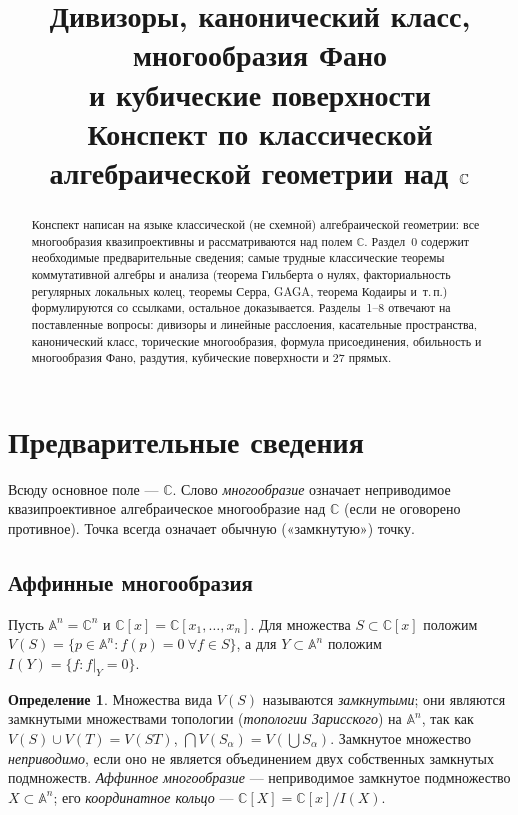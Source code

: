 \documentclass[11pt,a4paper]{article}
\title{Дивизоры, канонический класс, многообразия Фано\\ и кубические поверхности\\[4pt]
\large Конспект по классической алгебраической геометрии над $\C$}
\author{}
\date{}
\theoremstyle{plain}
\theoremstyle{definition}
\newtheorem{definition}[theorem]{Определение}
\theoremstyle{remark}
\renewcommand{\C}{\mathbb{C}}
\newcommand{\A}{\mathbb{A}}
\begin{document}
\maketitle

\begin{abstract}
Конспект написан на языке классической (не схемной) алгебраической геометрии: все многообразия
квазипроективны и рассматриваются над полем $\C$. Раздел~0 содержит необходимые предварительные
сведения; самые трудные классические теоремы коммутативной алгебры и анализа (теорема Гильберта
о нулях, факториальность регулярных локальных колец, теоремы Серра, GAGA, теорема Кодаиры и~т.\,п.)
формулируются со ссылками, остальное доказывается. Разделы~1--8 отвечают на поставленные вопросы:
дивизоры и линейные расслоения, касательные пространства, канонический класс, торические
многообразия, формула присоединения, обильность и многообразия Фано, раздутия, кубические
поверхности и 27 прямых.
\end{abstract}

\tableofcontents

\setcounter{section}{-1}
\section{Предварительные сведения}\label{sec:0}

Всюду основное поле --- $\C$. Слово \emph{многообразие} означает неприводимое квазипроективное
алгебраическое многообразие над $\C$ (если не оговорено противное). Точка всегда означает
обычную («замкнутую») точку.

\subsection{Аффинные многообразия}

Пусть $\A^n=\C^n$ и $\C[x]=\C[x_1,\dots,x_n]$. Для множества $S\subset\C[x]$ положим
$V(S)=\{p\in\A^n: f(p)=0\ \forall f\in S\}$, а для $Y\subset \A^n$ положим
$I(Y)=\{f: f|_Y=0\}$.

\begin{definition}
Множества вида $V(S)$ называются \emph{замкнутыми}; они являются замкнутыми множествами
топологии (\emph{топологии Зарисского}) на $\A^n$, так как
$V(S)\cup V(T)=V(ST)$, $\bigcap V(S_\alpha)=V(\bigcup S_\alpha)$. Замкнутое множество
\emph{неприводимо}, если оно не является объединением двух собственных замкнутых подмножеств.
\emph{Аффинное многообразие} --- неприводимое замкнутое подмножество $X\subset\A^n$;
его \emph{координатное кольцо} --- $\C[X]=\C[x]/I(X)$.
\end{definition}
\end{document}
